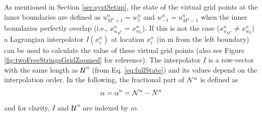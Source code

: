 As mentioned in Section \ref{sec:systSetup}, the state of the virtual grid points at the inner boundaries are defined as $u_{M^n+1}^n = w_1^n$ and $w_{-1}^n = u_{M^n-1}^n$ when the inner boundaries perfectly overlap  (i.e., $x^n_{u_{M^n}} = x^n_{w_0}$). If this is not the case ($x^n_{u_{M^n}} \neq x^n_{w_0}$) a Lagrangian interpolator $I(x_i^n)$ at location $x_i^n$ (in m from the left boundary) can be used to calculate the value of these virtual grid points (also see Figure \ref{fig:twoFreeStringsGridZoomed} for reference). The interpolator $I$ is a row-vector with the same length as $\mathbfcal{U}^n$ (from Eq. \eqref{eq:fullState}) and its values depend on the interpolation order. %
In the following, the fractional part of $\mathcal{N}^n$ %
is defined as 
\begin{equation}\label{eq:alphaDef}
    \alpha = \alpha^n = \Nfrac^n - N^n %
\end{equation}
and for clarity, $I$ and $\mathbfcal{U}^n$ are indexed by $m$.
